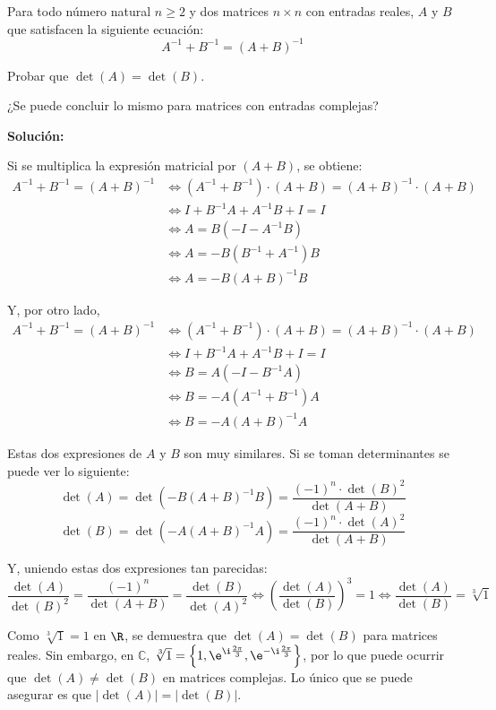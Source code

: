\documentclass[../../main.tex]{subfiles}
\begin{document}
  \begin{shaded}
    Para todo número natural $n \geq 2$ y dos matrices $n \times n$ con entradas reales, $A$ y $B$ que satisfacen la siguiente ecuación:
    $$
    A^{-1} + B^{-1} = (A + B)^{-1}
    $$

    Probar que $\det{(A)} = \det{(B)}$.

    ¿Se puede concluir lo mismo para matrices con entradas complejas?
  \end{shaded}

  \textbf{Solución:}

  Si se multiplica la expresión matricial por $(A + B)$, se obtiene:
  \begin{equation*}
    \begin{split}
      A^{-1} + B^{-1} = (A + B)^{-1} & \iff
      (A^{-1} + B^{-1}) \cdot (A + B) = (A + B)^{-1} \cdot (A + B) \\ & \iff
      I + B^{-1} A + A^{-1} B + I = I \\ & \iff
      A = B (-I - A^{-1} B) \\ & \iff
      A = -B (B^{-1} + A^{-1}) B \\ & \iff
      A = -B (A + B)^{-1} B
    \end{split}
  \end{equation*}

  Y, por otro lado,
  \begin{equation*}
    \begin{split}
      A^{-1} + B^{-1} = (A + B)^{-1} & \iff
      (A^{-1} + B^{-1}) \cdot (A + B) = (A + B)^{-1} \cdot (A + B) \\ & \iff
      I + B^{-1} A + A^{-1} B + I = I \\ & \iff
      B = A (-I - B^{-1} A) \\ & \iff
      B = -A (A^{-1} + B^{-1}) A \\ & \iff
      B = -A (A + B)^{-1} A
    \end{split}
  \end{equation*}

  Estas dos expresiones de $A$ y $B$ son muy similares. Si se toman determinantes se puede ver lo siguiente:
  $$
  \det{(A)} = \det{\left( -B (A + B)^{-1} B\right)} = \frac{(-1)^n \cdot \det{(B)}^2}{\det{(A + B)}}
  $$
  $$
  \det{(B)} = \det{\left(-A (A + B)^{-1} A\right)} = \frac{(-1)^n \cdot \det{(A)}^2}{\det{(A + B)}}
  $$

  Y, uniendo estas dos expresiones tan parecidas:
  $$
  \frac{\det{(A)}}{\det{(B)}^2} = \frac{(-1)^n}{\det{(A + B)}} = \frac{\det{(B)}}{\det{(A)}^2} \iff \left(\frac{\det{(A)}}{\det{(B)}}\right)^3 = 1 \iff \frac{\det{(A)}}{\det{(B)}} = \sqrt[3]{1}
  $$

  Como $\sqrt[3]{1} = 1$ en $\R$, se demuestra que $\det{(A)} = \det{(B)}$ para matrices reales. Sin embargo, en $\mathbb{C}$, $\sqrt[3]{1} = \left\{ 1, \e^{\i\frac{2\pi}{3}}, \e^{-\i\frac{2\pi}{3}}\right\}$, por lo que puede ocurrir que $\det{(A)} \ne \det{(B)}$ en matrices complejas. Lo único que se puede asegurar es que $|\det{(A)}| = |\det{(B)}|$.
\end{document}
